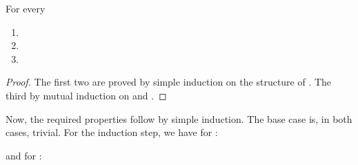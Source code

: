 \documentclass[a4paper,11pt]{llncs}
\begin{document}
\begin{lemma}
\label{lemma:facts-odot}
  For every
  \begin{enumerate}
\item 
\item 
\item 
  \end{enumerate}
\end{lemma}
\begin{proof}
  The first two are proved by simple induction on the structure of
  . The third by mutual induction on  and .
\end{proof}

Now, the required properties follow by simple induction. The base case is, in
both cases, trivial. For the induction step, we have for :

\noindent and for :
\end{document}
